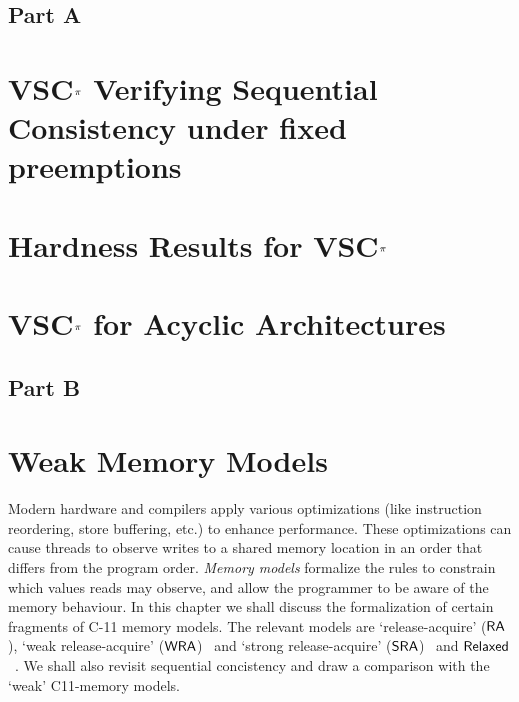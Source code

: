 \documentclass[12pt,a4paper]{report}
\begin{document}
\begin{center}
    \chapter*{\centering Part A}
\end{center}





\chapter{VSC$^\pi$ Verifying Sequential Consistency under fixed preemptions} \label{sc-1}
 

\chapter{Hardness Results for VSC$^\pi$}\label{SC-hardness}



% 

\chapter{VSC$^\pi$ for Acyclic Architectures}
\label{sc-acyclic} 


\begin{center}
    \chapter*{\centering Part B}
\end{center}
  


\chapter{Weak Memory Models}

Modern hardware and compilers apply various optimizations (like instruction reordering, store buffering, etc.) to enhance performance. These optimizations can cause threads to observe writes to a shared memory location in an order that differs from the program order. \emph{Memory models} formalize the rules to constrain which values reads may observe, and allow the programmer to be aware of the memory behaviour. In this chapter we shall discuss the formalization of certain fragments of C-11 memory models.   The relevant models are `release-acquire' ($\mathsf{RA}$), `weak release-acquire' ($\mathsf{WRA}$)~\cite{KLSV:popl18} and  `strong release-acquire' ($\mathsf{SRA}$)~\cite{Lahav:2022} and $\mathsf{Relaxed}$~\cite{Margalit:2021:POPL,Norris:2013:OOPSLA}. We shall also revisit sequential concistency and draw a comparison with the `weak' C11-memory models.
\end{document}
